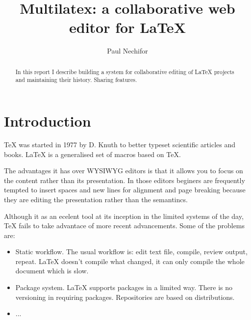 \documentclass{llncs}
\begin{document}
\title{Multilatex: a collaborative web editor for \LaTeX}

\author{Paul Nechifor}


\maketitle

\begin{abstract}

In this report I describe building a system for collaborative editing of \LaTeX{} projects and maintaining their history. Sharing features.

\end{abstract}

\section{Introduction}

\TeX{} was started in 1977 by D. Knuth to better typeset scientific articles and books. \LaTeX{} is a generalised set of macros based on \TeX{}.

The advantages it has over WYSIWYG editors is that it allows you to focus on the content rather than its presentation. In those editors beginers are frequently tempted to insert spaces and new lines for alignment and page breaking because they are editing the presentation rather than the semantincs.

Although it as an ecelent tool at its inception in the limited systems of the day, \TeX{} fails to take advantace of more recent advancements. Some of the problems are:

\begin{itemize}

\item Static workflow. The usual workflow is: edit text file, compile, review output, repeat. \LaTeX{} doesn't compile what changed, it can only compile the whole document which is slow.

\item Package system. \LaTeX{} supports packages in a limited way. There is no versioning in requiring packages. Repositories are based on distributions.

\item ...

\end{itemize}
\end{document}
